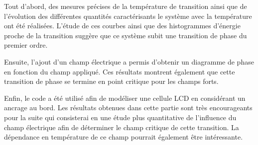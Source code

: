 \documentclass[11pt,a4paper]{article}
\numberwithin{equation}{section}
\begin{document}
Tout d'abord, des mesures précises de la température de transition ainsi que de l'évolution des différentes quantités caractérisants le système avec la température ont été réalisées. L'étude de ces courbes ainsi que des histogrammes d'énergie proche de la transition suggère que ce système subit une transition de phase du premier ordre.
\medskip

Ensuite, l'ajout d'un champ électrique a permis d'obtenir un diagramme de phase en fonction du champ appliqué. Ces résultats montrent également que cette transition de phase se termine en point critique pour les champs forts.
\medskip

Enfin, le code a été utilisé afin de modéliser une cellule LCD en considérant un ancrage au bord. Les résultats obtenues dans cette partie sont très encourageants pour la suite qui consisterai en une étude plus quantitative de l'influence du champ électrique afin de déterminer le champ critique de cette transition. La dépendance en température de ce champ pourrait également être intéressante.


 
\end{document}
